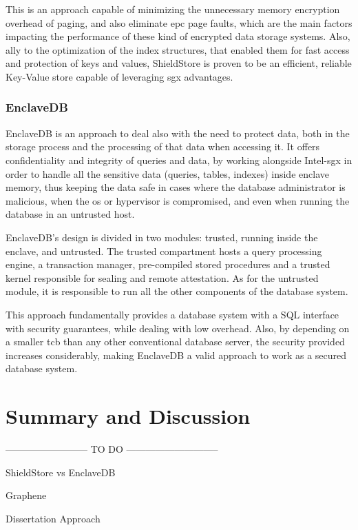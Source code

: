This is an approach capable of minimizing the unnecessary memory encryption overhead of paging, and also eliminate \gls{epc} page faults, which are the main factors impacting the performance of these kind of encrypted data storage systems. Also, ally to the optimization of the index structures, that enabled them for fast access and protection of keys and values, ShieldStore is proven to be an efficient, reliable Key-Value store capable of leveraging \gls{sgx} advantages.


\subsubsection{EnclaveDB}
EnclaveDB \cite{enclavedbPaper} is an approach to deal also with the need to protect data, both in the storage process and the processing of that data when accessing it. It offers confidentiality and integrity of queries and data, by working alongside Intel-\gls{sgx} in order to handle all the sensitive data (queries, tables, indexes) inside enclave memory, thus keeping the data safe in cases where the database administrator is malicious, when the \gls{os} or hypervisor is compromised, and even when running the database in an untrusted host. 

EnclaveDB's design is divided in two modules: trusted, running inside the enclave, and untrusted. The trusted compartment hosts a query processing engine, a transaction manager, pre-compiled stored procedures and a trusted kernel responsible for sealing and remote attestation. As for the untrusted module, it is responsible to run all the other components of the database system. 

This approach fundamentally provides a database system with a SQL interface with security guarantees, while dealing with low overhead. Also, by depending on a smaller \gls{tcb} than any other conventional database server, the security provided increases considerably, making EnclaveDB a valid approach to work as a secured database system.




\section{Summary and Discussion}
-------------------------- TO DO -----------------------------

ShieldStore vs EnclaveDB

Graphene

Dissertation Approach


